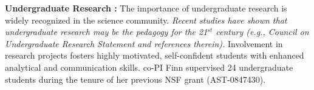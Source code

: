 \documentclass[11pt, preprint]{aastex}
\newcommand{\ha}{$H\alpha$}
\begin{document}
{{\bf Undergraduate Research  :}
The importance of undergraduate research is widely recognized
in the science community.
{\em Recent studies have shown that undergraduate research may be the
pedagogy for the 21$^{st}$ century (e.g., Council on Undergraduate Research
Statement and references therein).}
Involvement in research projects
fosters highly motivated, self-confident students with enhanced
analytical and communication skills. 
co-PI Finn supervised 24 undergraduate students during the tenure of her
previous NSF grant (AST-0847430).



}
\end{document}
